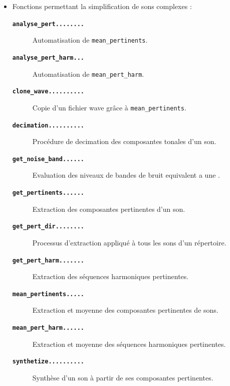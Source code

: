 \begin{itemize}
\bigskip
\item Fonctions permettant la simplification de sons complexes :
    \begin{description}
        \item[\textbf{\tt analyse\_pert........}]Automatisation de {\tt mean\_pertinents}.
        \item[\textbf{\tt analyse\_pert\_harm...}]Automatisation de {\tt mean\_pert\_harm}.
        \item[\textbf{\tt clone\_wave..........}]Copie d'un fichier wave gr{\^a}ce {\`a} {\tt mean\_pertinents}.
        \item[\textbf{\tt decimation..........}]Proc{\'e}dure de decimation des composantes tonales d'un son.
        \item[\textbf{\tt get\_noise\_band......}]Evaluation des niveaux de bandes de bruit equivalent a une \dsp.
        \item[\textbf{\tt get\_pertinents......}]Extraction des composantes pertinentes d'un son.
        \item[\textbf{\tt get\_pert\_dir........}]Processus d'extraction appliqu{\'e} {\`a} tous les sons d'un r{\'e}pertoire.
        \item[\textbf{\tt get\_pert\_harm.......}]Extraction des s{\'e}quences harmoniques pertinentes.
        \item[\textbf{\tt mean\_pertinents.....}]Extraction et moyenne des composantes pertinentes de sons.
        \item[\textbf{\tt mean\_pert\_harm......}]Extraction et moyenne des s{\'e}quences harmoniques pertinentes.
        \item[\textbf{\tt synthetize..........}]Synth{\`e}se d'un son {\`a} partir de ses composantes pertinentes.
    \end{description}


\end{itemize}
